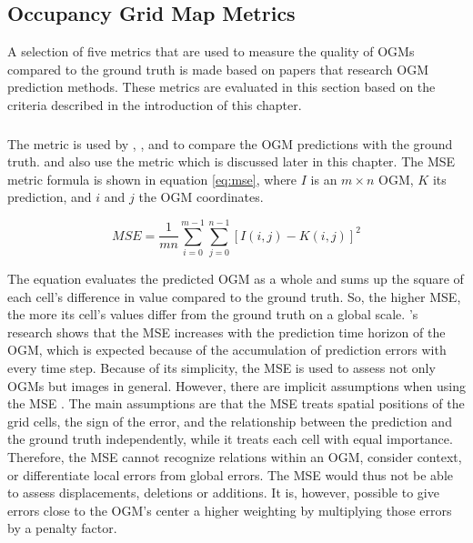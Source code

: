 \subsection{Occupancy Grid Map Metrics}
A selection of five metrics that are used to measure the quality of \glspl{OGM} compared to the ground truth is made based on papers that research \gls{OGM} prediction methods. These metrics are evaluated in this section based on the criteria described in the introduction of this chapter. 

\subsubsection{} 
The  metric is used by \cite{itkina2019dynamic}, \cite{lange2020attention}, and \cite{toyungyernsub2020double} to compare the \gls{OGM} predictions with the ground truth. \cite{lange2020attention} and \cite{toyungyernsub2020double} also use the  metric which is discussed later in this chapter. The \gls{MSE} metric formula is shown in equation \ref{eq:mse}, where $I$ is an $m \times n$ \gls{OGM}, $K$ its prediction, and $i$ and $j$ the \gls{OGM} coordinates.

\begin{equation} \label{eq:mse}
	MSE = \frac{1}{mn}\sum_{i=0}^{m-1}\sum_{j=0}^{n-1}[I(i,j)-K(i,j)]^2
\end{equation}

The equation evaluates the predicted \gls{OGM} as a whole and sums up the square of each cell's difference in value compared to the ground truth. So, the higher \gls{MSE}, the more its cell's values differ from the ground truth on a global scale. \cite{toyungyernsub2020double}'s research shows that the \gls{MSE} increases with the prediction time horizon of the \gls{OGM}, which is expected because of the accumulation of prediction errors with every time step. Because of its simplicity, the \gls{MSE} is used to assess not only \glspl{OGM} but images in general. However, there are implicit assumptions when using the \gls{MSE} \cite{wang2009mean}. The main assumptions are that the \gls{MSE} treats spatial positions of the grid cells, the sign of the error, and the relationship between the prediction and the ground truth independently, while it treats each cell with equal importance. Therefore, the \gls{MSE} cannot recognize relations within an \gls{OGM}, consider context, or differentiate local errors from global errors. The \gls{MSE} would thus not be able to assess displacements, deletions or additions. It is, however, possible to give errors close to the \gls{OGM}'s center a higher weighting by multiplying those errors by a penalty factor.    

